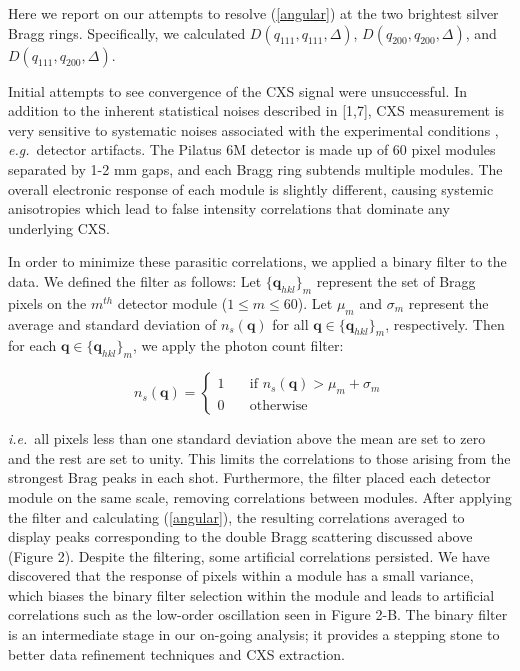 \documentclass [11pt,fleqn]{article}
\begin{document}
Here we report on our attempts to resolve (\ref{angular}) at the two brightest silver Bragg rings. Specifically, we calculated $D (q_{111},q_{111}, \Delta  )$, $D (q_{200},q_{200}, \Delta  )$, and $D (q_{111},q_{200}, \Delta  )$. 

Initial attempts to see convergence of the CXS signal were unsuccessful. In addition to the inherent statistical noises described in [1,7], CXS measurement  is very sensitive to systematic noises associated with the experimental conditions \cite{Kam:1981ua}, \textit{e.g.}~detector artifacts. The Pilatus 6M detector is made up of 60 pixel modules separated by 1-2 mm gaps, and each Bragg ring subtends multiple modules. The overall electronic response of each module is slightly different, causing systemic anisotropies which lead to false intensity correlations that dominate any underlying CXS. 

In order to minimize these parasitic correlations, we applied a binary filter to the data. We defined the filter as follows: Let $\{ \bm q_{hkl} \}_{m}$ represent the set of Bragg pixels on the $m^{th}$ detector module ($1 \leq m \leq 60$). Let $\mu_m$ and $\sigma_m$ represent the average and standard deviation of $n_{s}(\bm q)$  for all $\bm q \in \{ \bm q_{hkl} \}_{m} $, respectively. Then for each $\bm q \in \{ \bm q_{hkl} \}_{m} $, we apply the photon count filter:

\[  n_{s}(\bm q ) = 
 \begin{cases} 
   1 & \quad \text{if } n_{s}(\bm q ) > \mu_m +  \sigma_m\\
   0 & \quad \text{otherwise} 
 \end{cases} 
 \]

\textit{i.e.}~all pixels less than one standard deviation above the mean are set to zero and the rest are set to unity. This limits the correlations to those arising from the strongest Brag peaks in each shot. Furthermore, the filter placed each detector module on the same scale, removing correlations between modules.  After applying the filter and calculating (\ref{angular}), the resulting correlations averaged to display peaks corresponding to the double Bragg scattering discussed above (Figure 2). Despite the filtering, some artificial correlations persisted. We have discovered that the response of pixels within a module has a small variance,  which biases the binary filter selection within the module and leads to artificial correlations such as the low-order oscillation seen in Figure 2-B. The binary filter is an intermediate stage in our on-going analysis; it provides a stepping stone to better data refinement techniques and CXS extraction.
\end{document}
